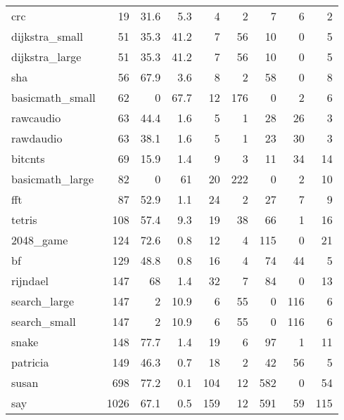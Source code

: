 \begin{tabular}{lrrrrrrrr}
 crc             &       19 &     31.6 &    5.3 &    4 &    2 &      7 &     6 &     2 \\
 dijkstra\_small  &       51 &     35.3 &   41.2 &    7 &   56 &     10 &     0 &     5 \\
 dijkstra\_large  &       51 &     35.3 &   41.2 &    7 &   56 &     10 &     0 &     5 \\
 sha             &       56 &     67.9 &    3.6 &    8 &    2 &     58 &     0 &     8 \\
 basicmath\_small &       62 &      0   &   67.7 &   12 &  176 &      0 &     2 &     6 \\
 rawcaudio       &       63 &     44.4 &    1.6 &    5 &    1 &     28 &    26 &     3 \\
 rawdaudio       &       63 &     38.1 &    1.6 &    5 &    1 &     23 &    30 &     3 \\
 bitcnts         &       69 &     15.9 &    1.4 &    9 &    3 &     11 &    34 &    14 \\
 basicmath\_large &       82 &      0   &   61   &   20 &  222 &      0 &     2 &    10 \\
 fft             &       87 &     52.9 &    1.1 &   24 &    2 &     27 &     7 &     9 \\
 tetris          &      108 &     57.4 &    9.3 &   19 &   38 &     66 &     1 &    16 \\
 2048\_game       &      124 &     72.6 &    0.8 &   12 &    4 &    115 &     0 &    21 \\
 bf              &      129 &     48.8 &    0.8 &   16 &    4 &     74 &    44 &     5 \\
 rijndael        &      147 &     68   &    1.4 &   32 &    7 &     84 &     0 &    13 \\
 search\_large    &      147 &      2   &   10.9 &    6 &   55 &      0 &   116 &     6 \\
 search\_small    &      147 &      2   &   10.9 &    6 &   55 &      0 &   116 &     6 \\
 snake           &      148 &     77.7 &    1.4 &   19 &    6 &     97 &     1 &    11 \\
 patricia        &      149 &     46.3 &    0.7 &   18 &    2 &     42 &    56 &     5 \\
 susan           &      698 &     77.2 &    0.1 &  104 &   12 &    582 &     0 &    54 \\
 say             &     1026 &     67.1 &    0.5 &  159 &   12 &    591 &    59 &   115 \\

\end{tabular}
